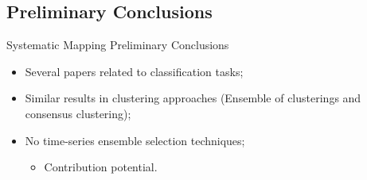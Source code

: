 \documentclass{beamer}
\begin{document}
\subsection{Preliminary Conclusions}
\begin{frame}{Systematic Mapping Preliminary Conclusions}
  \begin{itemize}
  \item Several papers related to classification tasks;
  \item Similar results in clustering approaches (Ensemble of clusterings and consensus clustering);
  \item No time-series ensemble selection techniques;
    \begin{itemize}
    \item Contribution potential.
    \end{itemize}
  \end{itemize}
\end{frame}

\section{}
\begin{frame}
  \titlepage
\end{frame}
\end{document}
